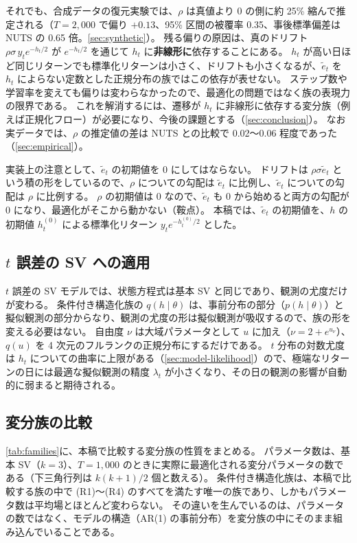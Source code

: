 それでも、合成データの復元実験では、$\rho$ は真値より 0 の側に約 25\% 縮んで推定される（$T = 2{,}000$ で偏り $+0.13$、95\% 区間の被覆率 0.35、事後標準偏差は NUTS の 0.65 倍。\cref{sec:synthetic}）。
残る偏りの原因は、真のドリフト $\rho\sigma\, y_t e^{-h_t/2}$ が $e^{-h_t/2}$ を通じて $h_t$ に\textbf{非線形に}依存することにある。
$h_t$ が高い日ほど同じリターンでも標準化リターンは小さく、ドリフトも小さくなるが、$\tilde e_t$ を $h_t$ によらない定数とした正規分布の族ではこの依存が表せない。
ステップ数や学習率を変えても偏りは変わらなかったので、最適化の問題ではなく族の表現力の限界である。
これを解消するには、遷移が $h_t$ に非線形に依存する変分族（例えば正規化フロー）が必要になり、今後の課題とする（\cref{sec:conclusion}）。
なお実データでは、$\rho$ の推定値の差は NUTS との比較で 0.02〜0.06 程度であった（\cref{sec:empirical}）。

実装上の注意として、$\tilde e_t$ の初期値を 0 にしてはならない。
ドリフトは $\rho\sigma\tilde e_t$ という積の形をしているので、$\rho$ についての勾配は $\tilde e_t$ に比例し、$\tilde e_t$ についての勾配は $\rho$ に比例する。
$\rho$ の初期値は 0 なので、$\tilde e_t$ も 0 から始めると両方の勾配が 0 になり、最適化がそこから動かない（鞍点）。
本稿では、$\tilde e_t$ の初期値を、$h$ の初期値 $h^{(0)}_t$ による標準化リターン $y_t e^{-h^{(0)}_t/2}$ とした。

\subsection{\texorpdfstring{$t$}{t} 誤差の SV への適用}\label{sec:fam-t}

$t$ 誤差の SV モデルでは、状態方程式は基本 SV と同じであり、観測の尤度だけが変わる。
条件付き構造化族の $q(h \mid \theta)$ は、事前分布の部分（$p(h \mid \theta)$）と擬似観測の部分からなり、観測の尤度の形は擬似観測が吸収するので、族の形を変える必要はない。
自由度 $\nu$ は大域パラメータとして $u$ に加え（$\nu = 2 + e^{u_\nu}$）、$q(u)$ を 4 次元のフルランクの正規分布にするだけである。
$t$ 分布の対数尤度は $h_t$ についての曲率に上限がある（\cref{sec:model-likelihood}）ので、極端なリターンの日には最適な擬似観測の精度 $\lambda_t$ が小さくなり、その日の観測の影響が自動的に弱まると期待される。

\subsection{変分族の比較}\label{sec:fam-summary}

\cref{tab:families}に、本稿で比較する変分族の性質をまとめる。
パラメータ数は、基本 SV（$k = 3$）、$T = 1{,}000$ のときに実際に最適化される変分パラメータの数である（下三角行列は $k(k+1)/2$ 個と数える）。
条件付き構造化族は、本稿で比較する族の中で (R1)〜(R4) のすべてを満たす唯一の族であり、しかもパラメータ数は平均場とほとんど変わらない。
その違いを生んでいるのは、パラメータの数ではなく、モデルの構造（AR(1) の事前分布）を変分族の中にそのまま組み込んでいることである。

